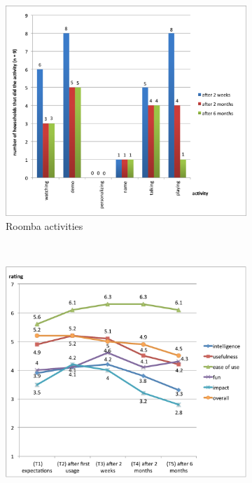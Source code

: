 \documentclass{frontiersSCNS} %
\begin{document}
\begin{figure}
        \centering
        \begin{subfigure}[b]{0.48\columnwidth}
                \includegraphics[width=\textwidth]{roomba-activities.png}
                \caption{Roomba activities}
                \label{fig:roomba-activities}
        \end{subfigure}%
        ~ %
        \begin{subfigure}[b]{0.48\columnwidth}
                \includegraphics[width=\textwidth]{roomba-perception.pdf}

\end{subfigure}
\end{figure}
\end{document}
